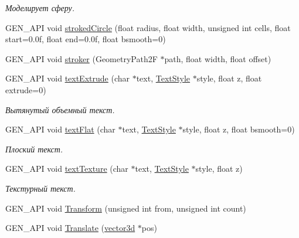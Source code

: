 \begin{DoxyCompactItemize}
\begin{DoxyCompactList}\small\item\em Моделирует сферу. \end{DoxyCompactList}\item 
G\-E\-N\-\_\-\-A\-P\-I void \hyperlink{classgen_1_1_modeller_mesh_a9bd2a64f71389863d5ec68aebd846715}{stroked\-Circle} (float radius, float width, unsigned int cells, float start=0.\-0f, float end=0.\-0f, float bsmooth=0)
\item 
G\-E\-N\-\_\-\-A\-P\-I void \hyperlink{classgen_1_1_modeller_mesh_a27bee288d0e04f12097aa545074725ee}{stroker} (Geometry\-Path2\-F $\ast$path, float width, float offset)
\item 
\hypertarget{classgen_1_1_modeller_mesh_a33580546f756ef1ffce569418adf387d}{G\-E\-N\-\_\-\-A\-P\-I void \hyperlink{classgen_1_1_modeller_mesh_a33580546f756ef1ffce569418adf387d}{text\-Extrude} (char $\ast$text, \hyperlink{classcsad_1_1_text_style}{Text\-Style} $\ast$style, float z, float extrude=0)}\label{classgen_1_1_modeller_mesh_a33580546f756ef1ffce569418adf387d}

\begin{DoxyCompactList}\small\item\em Вытянутый объемный текст. \end{DoxyCompactList}\item 
\hypertarget{classgen_1_1_modeller_mesh_a550b2136bd21d66b821832d6483b8a79}{G\-E\-N\-\_\-\-A\-P\-I void \hyperlink{classgen_1_1_modeller_mesh_a550b2136bd21d66b821832d6483b8a79}{text\-Flat} (char $\ast$text, \hyperlink{classcsad_1_1_text_style}{Text\-Style} $\ast$style, float z, float bsmooth=0)}\label{classgen_1_1_modeller_mesh_a550b2136bd21d66b821832d6483b8a79}

\begin{DoxyCompactList}\small\item\em Плоский текст. \end{DoxyCompactList}\item 
\hypertarget{classgen_1_1_modeller_mesh_ae80ac72c254d62cad0b54c3038fd449a}{G\-E\-N\-\_\-\-A\-P\-I void \hyperlink{classgen_1_1_modeller_mesh_ae80ac72c254d62cad0b54c3038fd449a}{text\-Texture} (char $\ast$text, \hyperlink{classcsad_1_1_text_style}{Text\-Style} $\ast$style, float z)}\label{classgen_1_1_modeller_mesh_ae80ac72c254d62cad0b54c3038fd449a}

\begin{DoxyCompactList}\small\item\em Текстурный текст. \end{DoxyCompactList}\item 
G\-E\-N\-\_\-\-A\-P\-I void \hyperlink{classgen_1_1_modeller_mesh_a84d7b5bdc92eea09ddc349934c34cf48}{Transform} (unsigned int from, unsigned int count)
\item 
\hypertarget{classgen_1_1_modeller_mesh_a8b8367bb554e0d608041ee3b29df87bd}{G\-E\-N\-\_\-\-A\-P\-I void \hyperlink{classgen_1_1_modeller_mesh_a8b8367bb554e0d608041ee3b29df87bd}{Translate} (\hyperlink{classbt_1_1vector3d}{vector3d} $\ast$pos)}\label{classgen_1_1_modeller_mesh_a8b8367bb554e0d608041ee3b29df87bd}


\end{DoxyCompactItemize}
